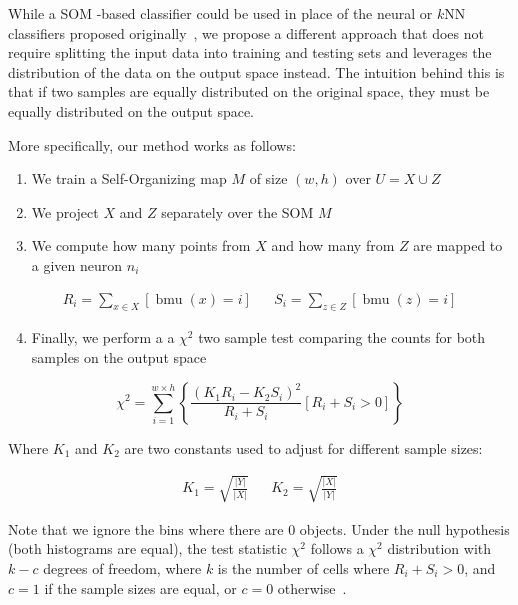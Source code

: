 While a \gls{SOM} -based classifier could be used in place of the neural or $k$NN classifiers proposed
originally~\cite{lopez2016revisiting}, we propose a different approach that does not require
splitting the input data into training and testing sets and leverages the distribution of the
data on the output space instead. The intuition behind this is that if two samples are equally
distributed on the original space, they must be equally distributed on the output space.

More specifically, our method works as follows:

\begin{enumerate}
    \item We train a Self-Organizing map $M$ of size $(w, h)$ over $U = X \cup Z$
    \item We project $X$ and $Z$ separately over the \gls{SOM}  $M$
    \item We compute how many points from $X$ and how many from $Z$ are mapped to a given neuron $n_i$
\end{enumerate}

\begin{align}
    R_i = \sum_{x \in X} [ \operatorname{bmu}(x) = i ] && S_i = \sum_{z \in Z} [ \operatorname{bmu}(z) = i ]
\end{align}

\begin{enumerate}
    \setcounter{enumi}{3}
    \item Finally, we perform a a $\chi^2$ two sample test comparing the counts for both samples
    on the output space
\end{enumerate}

\begin{equation}
    \label{eq:chi2}
    \chi^2 = \sum_{i=1}^{w \times h}{ \left\{ \frac{(K_1 R_i - K_2 S_i)^2}{R_i + S_i} [ R_i + S_i > 0 ] \right\}}
\end{equation}

Where $K_1$ and $K_2$ are two constants used to adjust for different sample sizes:

\begin{align}
    \label{eq:k1k2} K_1 = \sqrt{\frac{|Y|}{|X|}} && K_2 = \sqrt{\frac{|X|}{|Y|}}
\end{align}

Note that we ignore the bins where there are 0 objects. Under the null hypothesis
(both histograms are equal), the test statistic $\chi^2$ follows a $\chi^2$
distribution with $k - c$ degrees of freedom, where $k$ is the number of cells
where ${R_i + S_i > 0}$, and $c = 1$ if the sample sizes are equal, or $c = 0$
otherwise~\cite{press1993numerical}.

